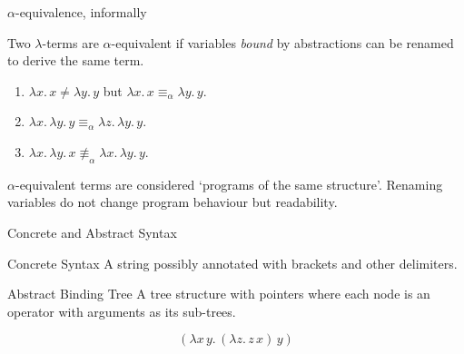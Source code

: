 \begin{frame}{$\alpha$-equivalence, informally}
  \begin{definition}
    Two $\lambda$-terms are \alert{$\alpha$-equivalent} if variables
    \emph{bound} by abstractions can be renamed to derive the same term. 
  \end{definition}
  \begin{example}
    \begin{enumerate}
      \item $\lambda x.\, x \neq \lambda y.\, y$  but $\lambda x.\, x
        \equiv_\alpha \lambda y.\, y$. 
      \item $\lambda x.\, \lambda y.\, y \equiv_\alpha 
        \lambda z.\, \lambda y.\, y$. 
      \item $\lambda x.\, \lambda y.\, x \mathrel{\not\equiv}_\alpha
        \lambda x.\, \lambda y.\, y$. 
    \end{enumerate}
  \end{example}
  $\alpha$-equivalent terms are considered `programs of the same structure'.
  Renaming variables do not change program behaviour but
  readability.
\end{frame}

\begin{frame}{Concrete and Abstract Syntax}
  \begin{block}{Concrete Syntax}
    A string possibly annotated with brackets and other delimiters.
  \end{block}
  
  \begin{block}{Abstract Binding Tree}
    A tree structure with pointers where each node is an operator 
    with arguments as its sub-trees.
  \end{block}

  \[
    (\lambda x\, y.\, (\lambda z.\, z\, x)\, y)
  \]
\end{frame}

